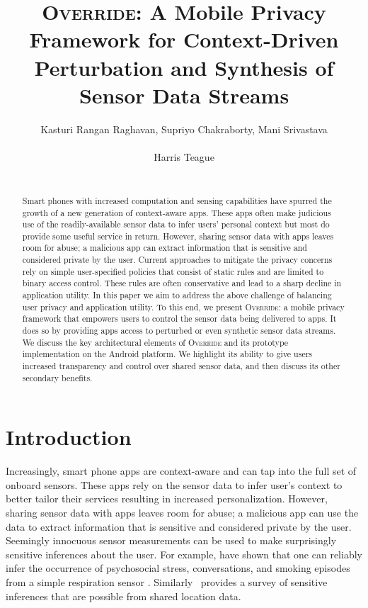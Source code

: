 \documentclass[10pt]{sensys-proc}
\author{
\alignauthor Kasturi Rangan Raghavan, Supriyo Chakraborty, Mani Srivastava\\
\affaddr{University of California, Los Angeles}\\
\email{\{kasturir,supriyo,mani\}@ucla.edu}
\alignauthor Harris Teague \\
\affaddr{Qualcomm Inc.}\\
\email{hteague@qualcomm.com}
}
\title{\textsc{Override}: A Mobile Privacy Framework for Context-Driven Perturbation and Synthesis of Sensor Data Streams}
\begin{document}
\maketitle

\begin{abstract}
Smart phones with increased computation and sensing capabilities have spurred the growth of a new generation of context-aware apps. These apps often make judicious use of the readily-available sensor data to infer users' personal context but most do provide some useful service in return. However, sharing sensor data with apps leaves room for abuse; a malicious app can extract information that is sensitive and considered private by the user. Current approaches to mitigate the privacy concerns rely on simple user-specified policies that consist of static rules and are limited to binary access control. These rules are often conservative and lead to a sharp decline in application utility. In this paper we aim to  address the above challenge of balancing user privacy and application utility. To this end, we present \textsc{Override}: a mobile privacy framework that empowers users to control the sensor data being delivered to apps. It does so by providing apps access to perturbed or even synthetic sensor data streams. We discuss the key architectural elements of \textsc{Override} and its prototype implementation on the Android platform. We highlight its ability to give users increased transparency and control over shared sensor data, and then discuss its other secondary benefits.
\end{abstract}

\section{Introduction}
\label{sec:intro}
Increasingly, smart phone apps are context-aware and can tap into the full set of onboard sensors. These apps rely on the sensor data to infer user's context to better tailor their services resulting in increased personalization. However, sharing sensor data with apps leaves room for abuse; a malicious app can use the data to extract information that is sensitive and considered private by the user. Seemingly innocuous sensor measurements can be used to make surprisingly sensitive inferences about the user. For example, \cite{plarre:psychological, rahman:mConverse} have shown that one can reliably infer the occurrence of psychosocial stress, conversations, and smoking episodes from a simple respiration sensor
\cite{Ertin:AutoSense}. Similarly~\cite{krumm:survey} provides a survey of sensitive inferences that are possible from shared location data.
\end{document}
